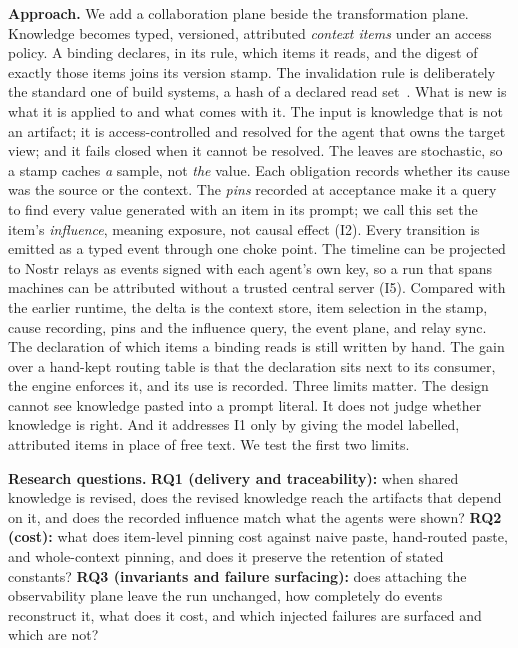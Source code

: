 \documentclass[10pt,conference]{IEEEtran}
\theoremstyle{definition}
\begin{document}
\smallskip\noindent\textbf{Approach.} We add a collaboration plane beside the transformation plane. Knowledge
becomes typed, versioned, attributed \emph{context items} under an access policy. A binding declares, in its
rule, which items it reads, and the digest of exactly those items joins its version stamp. The invalidation
rule is deliberately the standard one of build systems, a hash of a declared read set~\cite{mokhov2018build}.
What is new is what it is applied to and what comes with it. The input is knowledge that is not an artifact;
it is access-controlled and resolved for the agent that owns the target view; and it fails closed when it
cannot be resolved. The leaves are stochastic, so a stamp caches \emph{a} sample, not \emph{the} value. Each
obligation records whether its cause was the source or the context. The \emph{pins} recorded at acceptance
make it a query to find every value generated with an item in its prompt; we call this set the item's
\emph{influence}, meaning exposure, not causal effect (I2). Every transition is emitted as a typed event
through one choke point. The timeline can be projected to Nostr relays as events signed with each agent's own
key, so a run that spans machines can be attributed without a trusted central server (I5). Compared with the
earlier runtime, the delta is the context store, item selection in the stamp, cause recording, pins and the
influence query, the event plane, and relay sync. The declaration of which items a binding reads is still
written by hand. The gain over a hand-kept routing table is that the declaration sits next to its consumer,
the engine enforces it, and its use is recorded. Three limits matter. The design cannot see knowledge pasted
into a prompt literal. It does not judge whether knowledge is right. And it addresses I1 only by giving the
model labelled, attributed items in place of free text. We test the first two limits.

\smallskip\noindent\textbf{Research questions.}
\textbf{RQ1 (delivery and traceability):} when shared knowledge is revised, does the revised knowledge reach
the artifacts that depend on it, and does the recorded influence match what the agents were shown?
\textbf{RQ2 (cost):} what does item-level pinning cost against naive paste, hand-routed paste, and
whole-context pinning, and does it preserve the retention of stated constants?
\textbf{RQ3 (invariants and failure surfacing):} does attaching the observability plane leave the run
unchanged, how completely do events reconstruct it, what does it cost, and which injected failures are
surfaced and which are not?
\end{document}
